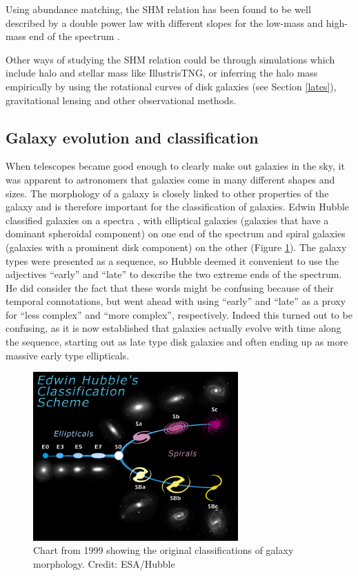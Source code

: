Using abundance matching, the SHM relation has been found to be well described by a double power law with different slopes for the low-mass and high-mass end of the spectrum \parencite{Behroozi2013}. 

Other ways of studying the SHM relation could be through simulations which include halo and stellar mass like IllustrisTNG, or inferring the halo mass empirically by using the rotational curves of disk galaxies (see Section \ref{lates}), gravitational lensing and other observational methods.

\subsection{Galaxy evolution and classification}

When telescopes became good enough to clearly make out galaxies in the sky, it was apparent to astronomers that galaxies come in many different shapes and sizes. The morphology of a galaxy is closely linked to other properties of the galaxy and is therefore important for the classification of galaxies. Edwin Hubble classified galaxies on a spectra \parencite{Hubble1926}, with elliptical galaxies (galaxies that have a dominant spheroidal component) on one end of the spectrum and spiral galaxies (galaxies with a prominent disk component) on the other (Figure \ref{hubble}). The galaxy types were presented as a sequence, so Hubble deemed it convenient to use the adjectives ``early'' and ``late'' to describe the two extreme ends of the spectrum. He did consider the fact that these words might be confusing because of their temporal connotations, but went ahead with using ``early'' and ``late'' as a proxy for ``less complex'' and ``more complex'', respectively. Indeed this turned out to be confusing, as it is now established that galaxies actually evolve with time along the sequence, starting out as late type disk galaxies and often ending up as more massive early type ellipticals.

\begin{figure}
    \centering
    \includegraphics[width=0.7\textwidth]{images/hubble.jpg}
    \caption{Chart from 1999 showing the original classifications of galaxy morphology. Credit: ESA/Hubble}
    \label{hubble}
\end{figure}


